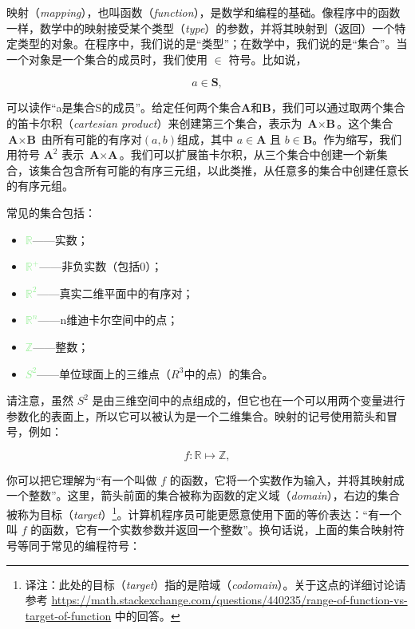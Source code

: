 \documentclass[lang=cn,12pt]{elegantbook}
\begin{document}
映射（\textit{mapping}），也叫函数（\textit{function}），是数学和编程的基础。像程序中的函数一样，数学中的映射接受某个类型（\textit{type}）的参数，并将其映射到（返回）一个特定类型的对象。在程序中，我们说的是“类型”；在数学中，我们说的是“集合”。当一个对象是一个集合的成员时，我们使用 $\in$ 符号。比如说，

$$a \in \textbf{S},$$

可以读作“a是集合S的成员”。给定任何两个集合$\textbf{A}$和$\textbf{B}$，我们可以通过取两个集合的笛卡尔积（\textit{cartesian product}）来创建第三个集合，表示为 $\textbf{A} \times \textbf{B}$。这个集合 $\textbf{A} \times \textbf{B}$ 由所有可能的有序对$(a,b)$组成，其中 $a \in \textbf{A}$ 且 $b \in \textbf{B}$。作为缩写，我们用符号 $\textbf{A}^2$ 表示 $\textbf{A} \times \textbf{A}$。我们可以扩展笛卡尔积，从三个集合中创建一个新集合，该集合包含所有可能的有序三元组，以此类推，从任意多的集合中创建任意长的有序元组。

常见的集合包括：

\begin{itemize}
  \item \textcolor{lightgreen}{$\mathbb{R}$}——实数；
  \item \textcolor{lightgreen}{$\mathbb{R^+}$}——非负实数（包括0）；
  \item \textcolor{lightgreen}{$\mathbb{R}^2$}——真实二维平面中的有序对；
  \item \textcolor{lightgreen}{$\mathbb{R}^n$}——n维迪卡尔空间中的点；
  \item \textcolor{lightgreen}{$\mathbb{Z}$}——整数；
  \item \textcolor{lightgreen}{$S^2$}——单位球面上的三维点（$R^3$中的点）的集合。
\end{itemize}

请注意，虽然 $S^2$ 是由三维空间中的点组成的，但它也在一个可以用两个变量进行参数化的表面上，所以它可以被认为是一个二维集合。映射的记号使用箭头和冒号，例如：

$$f : \mathbb{R} \mapsto \mathbb{Z}, $$

你可以把它理解为“有一个叫做 $f$ 的函数，它将一个实数作为输入，并将其映射成一个整数”。这里，箭头前面的集合被称为函数的定义域（\textit{domain}），右边的集合被称为目标（\textit{target}）\footnote[1]{译注：此处的目标（\textit{target}）指的是陪域（\textit{codomain}）。关于这点的详细讨论请参考 \url{https://math.stackexchange.com/questions/440235/range-of-function-vs-target-of-function} 中的回答。}。计算机程序员可能更愿意使用下面的等价表达：“有一个叫 $f$ 的函数，它有一个实数参数并返回一个整数”。换句话说，上面的集合映射符号等同于常见的编程符号：
\end{document}
